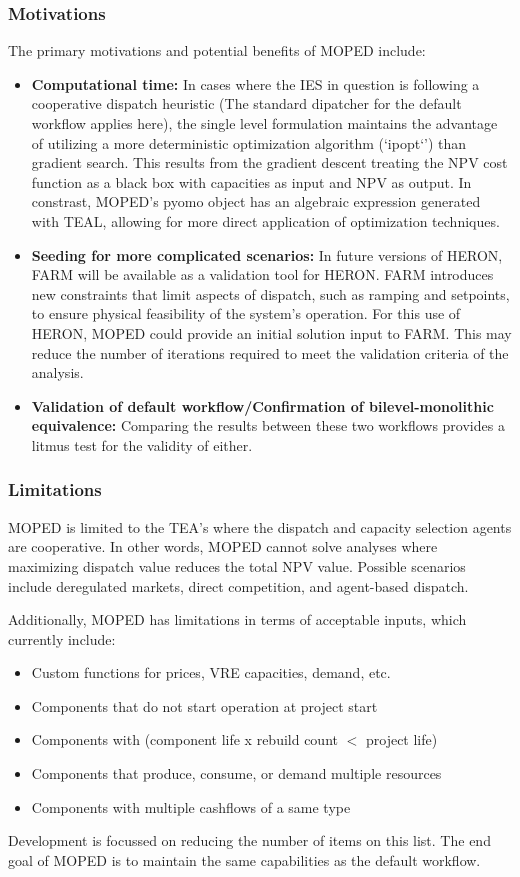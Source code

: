 \subsubsection{Motivations}
The primary motivations and potential benefits of MOPED include:
\begin{itemize}
    \item \textbf{Computational time:} In cases where the IES in question is following a cooperative dispatch heuristic (The standard dipatcher for the default workflow applies here), the single level formulation maintains the advantage of utilizing a more deterministic optimization algorithm
          (`ipopt`') than gradient search. This results from the gradient descent treating the NPV cost function as a black box with capacities as input and NPV as output. In constrast, MOPED's pyomo object has an algebraic expression generated with TEAL, allowing for more direct application of optimization techniques.
    \item \textbf{Seeding for more complicated scenarios:} In future versions of HERON, FARM will be available as a validation tool for HERON. FARM introduces new constraints that limit aspects of dispatch, such as ramping and setpoints, to ensure physical feasibility of the system's operation.
          For this use of HERON, MOPED could provide an initial solution input to FARM. This may reduce the number of iterations required to meet the validation criteria of the analysis.
    \item \textbf{Validation of default workflow/Confirmation of bilevel-monolithic equivalence:} Comparing the results between these two workflows provides a litmus test for the validity of either.
\end{itemize}

\subsubsection{Limitations}
MOPED is limited to the TEA's where the dispatch and capacity selection agents are cooperative. In other words, MOPED cannot solve analyses where maximizing dispatch value reduces the total NPV value. Possible scenarios include deregulated markets, direct competition, and agent-based dispatch.

Additionally, MOPED has limitations in terms of acceptable inputs, which currently include:
\begin{itemize}
    \item Custom functions for prices, VRE capacities, demand, etc.
    \item Components that do not start operation at project start
    \item Components with (component life x rebuild count $<$ project life)
    \item Components that produce, consume, or demand multiple resources
    \item Components with multiple cashflows of a same type
\end{itemize}
Development is focussed on reducing the number of items on this list. The end goal of MOPED is to maintain the same capabilities as the default workflow.


